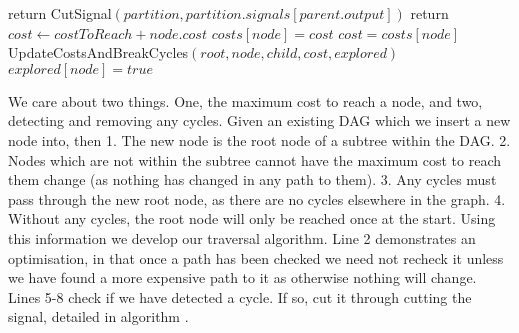 \documentclass[12pt,final,oneside]{article} %
\begin{document}
\begin{algorithm}
   \begin{algorithmic}[1]
       
            \State return
         \EndIf
          
            \State CutSignal$(partition, partition.signals[parent.output])$
            \State return
         \EndIf
         \State $cost \gets costToReach+node.cost$
            \State $costs[node] = cost$
         \Else
            \State $cost = costs[node]$
         \EndIf
            \State UpdateCostsAndBreakCycles$(root, node, child, cost, explored)$
         \EndFor
         \State $explored[node] = true$
      \EndProcedure
   \end{algorithmic}
\end{algorithm}
We care about two things. One, the maximum cost to reach a node, and two, detecting and removing any cycles.
Given an existing \ac{DAG}  which we insert a new node into, then 1. The new node is the root node of a subtree within the \ac{DAG}. 2. Nodes which are not within the subtree cannot have the maximum cost to reach them change (as nothing has changed in any path to them). 3. Any cycles must pass through the new root node, as there are no cycles elsewhere in the graph. 4. Without any cycles, the root node will only be reached once at the start.
Using this information we develop our traversal algorithm.
Line 2 demonstrates an optimisation, in that once a path has been checked we need not recheck it unless we have found a more expensive path to it as otherwise nothing will change.
Lines 5-8 check if we have detected a cycle. If so, cut it through cutting the signal, detailed in algorithm \cite{cutsignal}.
\newpage
\end{document}
